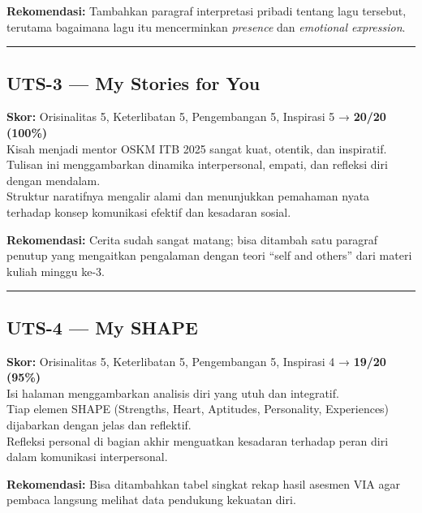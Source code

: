 \documentclass[
  letterpaper,
  DIV=11,
  numbers=noendperiod]{scrreprt}
\begin{document}
\textbf{Rekomendasi:} Tambahkan paragraf interpretasi pribadi tentang
lagu tersebut, terutama bagaimana lagu itu mencerminkan \emph{presence}
dan \emph{emotional expression}.

\begin{center}\rule{0.5\linewidth}{0.5pt}\end{center}

\subsection{UTS-3 --- My Stories for
You}\label{uts-3-my-stories-for-you-1}

\textbf{Skor:} Orisinalitas 5, Keterlibatan 5, Pengembangan 5, Inspirasi
5 → \textbf{20/20 (100\%)}\\
Kisah menjadi mentor OSKM ITB 2025 sangat kuat, otentik, dan
inspiratif.\\
Tulisan ini menggambarkan dinamika interpersonal, empati, dan refleksi
diri dengan mendalam.\\
Struktur naratifnya mengalir alami dan menunjukkan pemahaman nyata
terhadap konsep komunikasi efektif dan kesadaran sosial.

\textbf{Rekomendasi:} Cerita sudah sangat matang; bisa ditambah satu
paragraf penutup yang mengaitkan pengalaman dengan teori ``self and
others'' dari materi kuliah minggu ke-3.

\begin{center}\rule{0.5\linewidth}{0.5pt}\end{center}

\subsection{UTS-4 --- My SHAPE}\label{uts-4-my-shape}

\textbf{Skor:} Orisinalitas 5, Keterlibatan 5, Pengembangan 5, Inspirasi
4 → \textbf{19/20 (95\%)}\\
Isi halaman menggambarkan analisis diri yang utuh dan integratif.\\
Tiap elemen SHAPE (Strengths, Heart, Aptitudes, Personality,
Experiences) dijabarkan dengan jelas dan reflektif.\\
Refleksi personal di bagian akhir menguatkan kesadaran terhadap peran
diri dalam komunikasi interpersonal.

\textbf{Rekomendasi:} Bisa ditambahkan tabel singkat rekap hasil asesmen
VIA agar pembaca langsung melihat data pendukung kekuatan diri.
\end{document}
